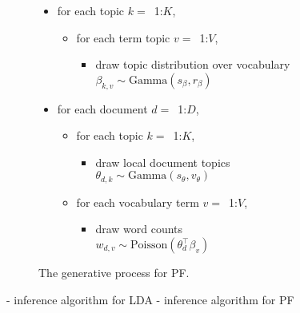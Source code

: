 \documentclass[11pt,letterpaper]{article}
\begin{document}
\begin{figure}
\begin{mdframed}
\small
\begin{itemize}[leftmargin=*]
\item for each topic $k=$~1:$K$,
	\begin{itemize}[leftmargin=*]
		\item for each term topic $v=$~1:$V$,
		\begin{itemize}[leftmargin=*]
			\item draw topic distribution over vocabulary \\$\beta_{k,v} \sim \mbox{Gamma} (s_\beta, r_\beta)$
		\end{itemize}
	\end{itemize}
\item for each document $d=$~1:$D$,
	\begin{itemize}[leftmargin=*]
		\item for each topic $k=$~1:$K$,
		\begin{itemize}[leftmargin=*]
			\item draw local document topics \\$\theta_{d,k} \sim \mbox{Gamma}(s_\theta, v_\theta)$
		\end{itemize}
		\item for each vocabulary term $v=$~1:$V$,
		\begin{itemize}[leftmargin=*]
			\item draw word counts \\$w_{d,v} \sim \mbox{Poisson}\left(\theta_d^\top\beta_v\right)$
		\end{itemize}
	\end{itemize}
\end{itemize}
\end{mdframed}
\caption{The generative process for PF.}
\label{fig:generative-PF}
\end{figure}

- inference algorithm for LDA
- inference algorithm for PF
\end{document}
